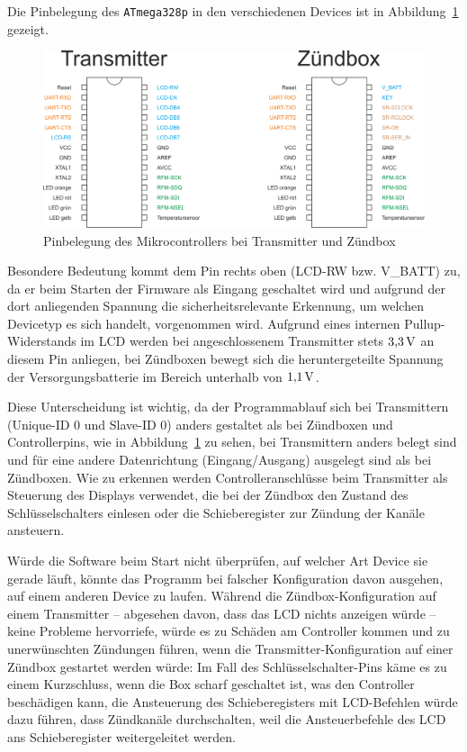 \documentclass[pdftex, parskip, numbers=noenddot, toc=listof]{scrbook}
\begin{document}
		Die Pinbelegung des \texttt{ATmega328p} in den verschiedenen Devices ist in Abbildung~\ref{fig:pinout} gezeigt.

		\begin{figure}
			\centering
			\includegraphics[width=.7\textwidth]{Bilder/pinout}
			\caption{Pinbelegung des Mikrocontrollers bei Transmitter und Zündbox}
			\label{fig:pinout}
		\end{figure}

		Besondere Bedeutung kommt dem Pin rechts oben (LCD-RW bzw. V\_BATT) zu, da er beim Starten der Firmware als Eingang geschaltet wird und aufgrund der dort anliegenden Spannung die sicherheitsrelevante Erkennung, um welchen Devicetyp es sich handelt, vorgenommen wird. Aufgrund eines internen Pullup-Widerstands im LCD werden bei angeschlossenem Transmitter stets $\unit[3{,}3]{V}$ an diesem Pin anliegen, bei Zündboxen bewegt sich die heruntergeteilte Spannung der Versorgungsbatterie im Bereich unterhalb von $\unit[1{,}1]{V}$.

		Diese Unterscheidung ist wichtig, da der Programmablauf sich bei Transmittern (Unique-ID 0 und Slave-ID 0) anders gestaltet als bei Zündboxen und Controllerpins, wie in Abbildung~\ref{fig:pinout} zu sehen, bei Transmittern anders belegt sind und für eine andere Datenrichtung (Eingang/Ausgang) ausgelegt sind als bei Zündboxen.  Wie zu erkennen werden Controlleranschlüsse beim Transmitter als Steuerung des Displays verwendet, die bei der Zündbox den Zustand des Schlüsselschalters einlesen oder die Schieberegister zur Zündung der Kanäle ansteuern.

		Würde die Software beim Start nicht überprüfen, auf welcher Art Device sie gerade läuft, könnte das Programm bei falscher Konfiguration davon ausgehen, auf einem anderen Device zu laufen. Während die Zündbox-Konfiguration auf einem Transmitter -- abgesehen davon, dass das LCD nichts anzeigen würde -- keine Probleme hervorriefe, würde es zu Schäden am Controller kommen und zu unerwünschten Zündungen führen, wenn die Transmitter-Konfiguration auf einer Zündbox gestartet werden würde: Im Fall des Schlüsselschalter-Pins käme es  zu einem Kurzschluss, wenn die Box scharf geschaltet ist, was den Controller beschädigen kann, die Ansteuerung des Schieberegisters mit LCD-Befehlen würde dazu führen, dass Zündkanäle durchschalten, weil die Ansteuerbefehle des LCD ans Schieberegister weitergeleitet werden.
\end{document}
